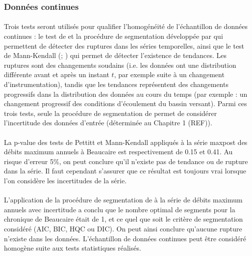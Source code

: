 	\subsubsection{Données continues}
	
	\paragraph{} Trois tests seront utilisés pour qualifier l'homogénéité de l'échantillon de données continues : le test de \citet{pettitt_non-parametric_1979} et la procédure de segmentation développée par \citet{darienzo_detection_2021-1} qui permettent de détecter des ruptures dans les séries temporelles, ainsi que le test de Mann-Kendall (\citet{mann_nonparametric_1945}; \citet{kendall_rank_1948}) qui permet de détecter l'existence de tendances. Les ruptures sont des changements soudains (i.e. les données ont une distribution différente avant et après un instant $t$, par exemple suite à un changement d'instrumentation), tandis que les tendances représentent des changements progressifs dans la distribution des données au cours du temps (par exemple : un changement progressif des conditions d'écoulement du bassin versant). Parmi ces trois tests, seule la procédure de segmentation de \citet{darienzo_detection_2021-1} permet de considérer l'incertitude des données d'entrée (déterminée au Chapitre 1 (REF)).
	
	\paragraph{} La p-value des tests de Pettitt et Mann-Kendall appliqués à la série maxpost des débits maximum annuels à Beaucaire est respectivement de 0.15 et 0.41. Au risque d'erreur 5\%, on peut conclure qu'il n'existe pas de tendance ou de rupture dans la série. Il faut cependant s'assurer que ce résultat est toujours vrai lorsque l'on considère les incertitudes de la série.
			
	\paragraph{} L'application de la procédure de segmentation de \citet{darienzo_detection_2021-1} à la série de débits maximum annuels avec incertitude a conclu que le nombre optimal de segments pour la chronique de Beaucaire était de 1, et ce quel que soit le critère de segmentation considéré (AIC, BIC, HQC ou DIC). On peut ainsi conclure qu'aucune rupture n'existe dans les données. L'échantillon de données continues peut être considéré homogène suite aux tests statistiques réalisés. 
	
